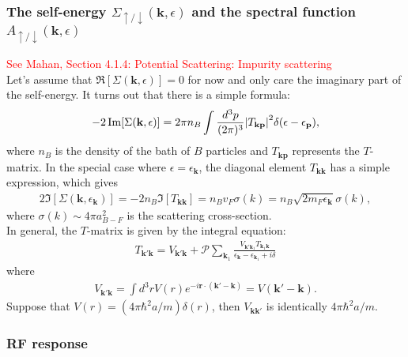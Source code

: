 \documentclass{article}
\theoremstyle{definition}
\newcommand{\f}[2]{\frac{#1}{#2}}
\begin{document}
\subsubsection{The self-energy $\Sigma_{\uparrow/\downarrow} (\mathbf{k}, \epsilon)$ and the spectral function $A_{\uparrow/\downarrow}(\mathbf{k}, \epsilon)$} 

\textcolor{red}{See Mahan, Section 4.1.4: Potential Scattering: Impurity scattering}\\


\noindent Let's assume that $\Re[\Sigma (\mathbf{k}, \epsilon)] = 0$ for now and only care the imaginary part of the self-energy. It turns out that there is a simple formula:
\begin{align}
-2 \Im [\Sigma (\mathbf{k}, \epsilon)] = 2 \pi n_B \int \f{d^3 p }{(2\pi)^3} \abs{T_{\mathbf{k}\mathbf{p}}}^2 \delta(\epsilon - \epsilon_\mathbf{p}),
\end{align}
where $n_B$ is the density of the bath of $B$ particles and $T_{\mathbf{k} \mathbf{p}}$ represents the $T$-matrix. In the special case where $\epsilon = \epsilon_\mathbf{k}$, the diagonal element $T_{\mathbf{kk}}$ has a simple expression, which gives 
\begin{align}
2 \Im [\Sigma (\mathbf{k}, \epsilon_\mathbf{k})] = -2 n_B \Im[T_\mathbf{kk}] = n_B v_F \sigma(k) = n_B \sqrt{2m_F \epsilon_\mathbf{k}} \sigma(k),
\end{align}
where $\sigma(k) \sim 4 \pi a_{B-F}^2$ is the scattering cross-section. \\

\noindent In general, the $T$-matrix is given by the integral equation:
\begin{align}
T_{\mathbf{k}'\mathbf{k}} = V_{\mathbf{k}'\mathbf{k}} + \mathcal{P}\sum_{\mathbf{k}_1} \f{ V_{\mathbf{k}'\mathbf{k}_1}  T_{\mathbf{k}_1\mathbf{k}}  }{\epsilon_\mathbf{k} - \epsilon_{\mathbf{k}_1} + i\delta}
\end{align}
where
\begin{align}
V_{\mathbf{k}'\mathbf{k}} = \int d^3 r V(r) e^{-i \mathbf{r} \cdot (\mathbf{k}' - \mathbf{k})} = V(\mathbf{k}' - \mathbf{k}). 
\end{align}
Suppose that $V(r) = (4\pi \hbar^2 a/m) \delta(r)$, then $V_{\mathbf{k k'}}$ is identically $4\pi \hbar^2 a/m$. 



\subsubsection{RF response}
\end{document}
